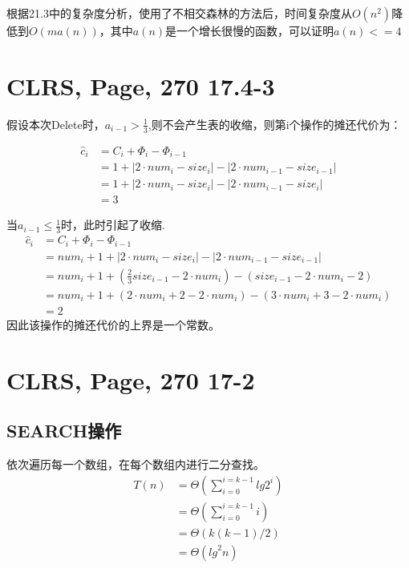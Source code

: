 \documentclass[UTF8]{ctexart}
\begin{document}
 根据21.3中的复杂度分析，使用了不相交森林的方法后，时间复杂度从$O(n^2)$降低到$O(ma(n))$，其中$a(n)$是一个增长很慢的函数，可以证明$a(n) <= 4$

\section{CLRS, Page, 270 17.4-3}
假设本次Delete时，$a_{i-1} > \frac{1}{3}$,则不会产生表的收缩，则第i个操作的摊还代价为：

\begin{align*}
    {\widehat{c}}_i &=  C_i + {\Phi}_i - {\Phi}_{i-1} \\
                    &= 1 + | 2\cdot num_i - size_i | - | 2\cdot num_{i-1} - size_{i-1} |\\
                    &= 1 + | 2\cdot num_i - size_i | - | 2\cdot num_{i-1} - size_{i} |\\
                    &= 3           
\end{align*}

当$a_{i-1} \leq \frac{1}{3}$时，此时引起了收缩.
\begin{align*}
    {\widehat{c}}_i &=  C_i + {\Phi}_i - {\Phi}_{i-1} \\
                    &= num_i + 1 + | 2\cdot num_i - size_i | - | 2\cdot num_{i-1} - size_{i-1} |\\
                    &= num_i + 1 + (\frac{2}{3}size_{i-1} - 2\cdot num_i) - (size_{i-1} - 2\cdot num_i - 2)\\
                    &= num_i + 1 + (2\cdot num_i + 2 - 2\cdot num_i) - (3\cdot num_i + 3 - 2\cdot num_i)\\
                    &= 2         
\end{align*}
因此该操作的摊还代价的上界是一个常数。  


\section{CLRS, Page, 270 17-2}

\subsection{SEARCH操作}
依次遍历每一个数组，在每个数组内进行二分查找。
\begin{align*}
    T(n)    &=  \Theta  (\sum_{i = 0}^{i = k-1}lg2^i )  \\  
            &=  \Theta  (\sum_{i = 0}^{i = k-1}i ) \\
            &= \Theta  (k(k-1)/2)\\
            &= \Theta({lg}^2n)
\end{align*}
\end{document}
